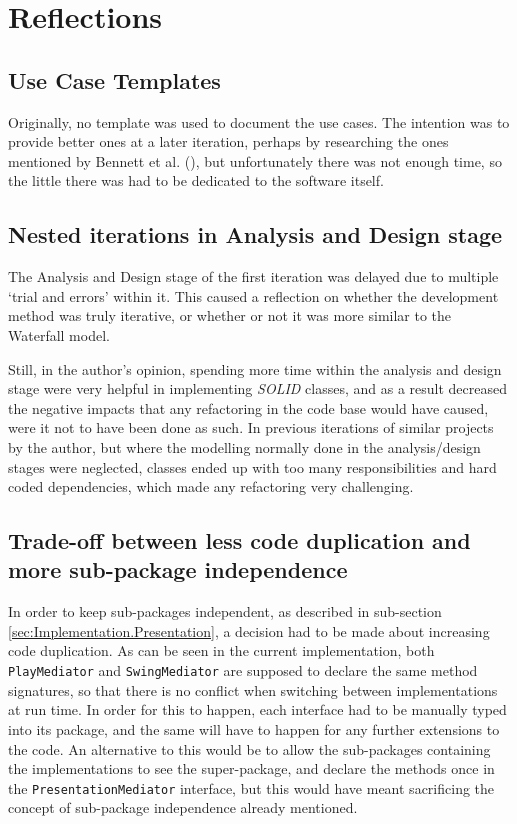 \section{Reflections} \label{sec:Reflections}

\subsection{Use Case Templates} \label{sec:Reflections.UseCaseTemplates}
Originally, no template was used to document the use cases. The intention was
to provide better ones at a later iteration, perhaps by researching the ones
mentioned by Bennett et al. (\citeyear[][p.~157]{bennett2010object}), but
unfortunately there was not enough time, so the little there was had to be
dedicated to the software itself.

\subsection{Nested iterations in Analysis and Design stage}
The Analysis and Design stage of the first iteration was delayed due to
multiple `trial and errors' within it. This caused a reflection on whether the
development method was truly iterative, or whether or not it was more similar
to the Waterfall model.

Still, in the author's opinion, spending more time within the analysis and
design stage were very helpful in implementing \emph{SOLID} classes, and as a
result decreased the negative impacts that any refactoring in the code base
would have caused, were it not to have been done as such. In previous
iterations of similar projects by the author, but where the modelling normally
done in the analysis/design stages were neglected, classes ended up with too
many responsibilities and hard coded dependencies, which made any refactoring
very challenging.


\subsection{Trade-off between less code duplication and more sub-package independence} \label{sec:Reflections.tradeoffs}
In order to keep sub-packages independent, as described in sub-section
\ref{sec:Implementation.Presentation}, a decision had to be made about
increasing code duplication. As can be seen in the current implementation, both
\texttt{PlayMediator} and \texttt{SwingMediator} are supposed to declare the
same method signatures, so that there is no conflict when switching between
implementations at run time. In order for this to happen, each interface had to
be manually typed into its package, and the same will have to happen for any
further extensions to the code. An alternative to this would be to allow the
sub-packages containing the implementations to see the super-package, and
declare the methods once in the \texttt{PresentationMediator} interface, but
this would have meant sacrificing the concept of sub-package independence
already mentioned.

